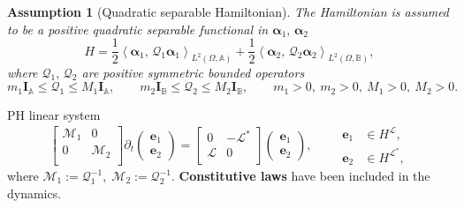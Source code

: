 \documentclass[aspectratio=169]{ISAE-Beamer}
\newcommand{\inner}[3][]{\ensuremath{\left\langle #2, \, #3 \right\rangle_{#1}}}
\newtheorem{assumption}{Assumption}
\begin{document}
\begin{frame}
	\begin{assumption}[Quadratic separable Hamiltonian]
		The Hamiltonian is assumed to be a positive quadratic separable functional in $\bm{\alpha}_1, \, \bm{\alpha}_2$ 
		\begin{equation*}
			H = \frac{1}{2} \inner[L^2(\Omega, \mathbb{A})]{\bm{\alpha}_{1}}{\mathcal{Q}_1\bm{\alpha}_{1}} + \frac{1}{2} \inner[L^2(\Omega, \mathbb{B})]{\bm{\alpha}_{2}}{\mathcal{Q}_2\bm{\alpha}_{2}},
		\end{equation*}
		where $\mathcal{Q}_1, \, \mathcal{Q}_2$ are positive symmetric bounded operators
		\begin{equation*}
			m_1 \bm{I}_\mathbb{A} \le\mathcal{Q}_1 \le M_1 \bm{I}_\mathbb{A}, \qquad  m_2 \bm{I}_\mathbb{B} \le \mathcal{Q}_2 \le M_2 \bm{I}_\mathbb{B}, \qquad m_1>0, \ m_2>0, \ M_1>0, \ M_2>0.
		\end{equation*} 
	\end{assumption}
	
	
	\begin{exampleblock}{PH linear system}
		\begin{equation*}
			\begin{bmatrix}
				\mathcal{M}_1 & 0 \\
				0 & \mathcal{M}_2 \\
			\end{bmatrix}
			\partial_t \begin{pmatrix}
				\bm{e}_1 \\ \bm{e}_2
			\end{pmatrix} = \begin{bmatrix}
				0 &  - \mathcal{L}^* \\
				\mathcal{L} & 0 \\
			\end{bmatrix}\begin{pmatrix}
				\bm{e}_1 \\ \bm{e}_2
			\end{pmatrix} , \qquad \begin{aligned}
				\bm{e}_1 &\in H^{\mathcal{L}}, 	\\
				\bm{e}_2 &\in H^{\mathcal{L}^*},
			\end{aligned}
		\end{equation*}
		where $\mathcal{M}_1:=\mathcal{Q}_1^{-1},\; \mathcal{M}_2:=\mathcal{Q}_2^{-1}$. \textbf{Constitutive laws} have been included in the dynamics.
	\end{exampleblock}
	
\end{frame}
\end{document}
